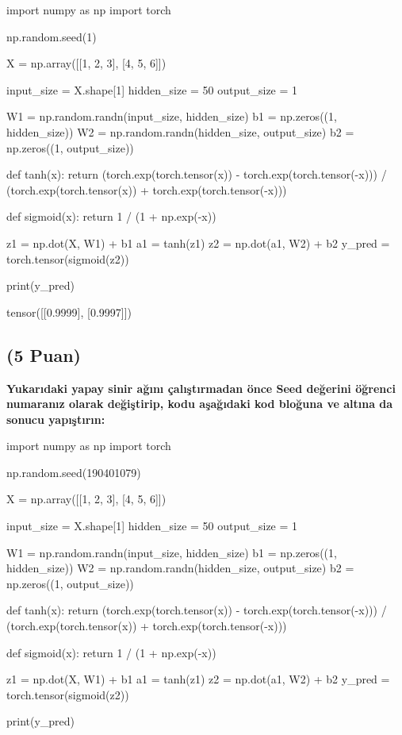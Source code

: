 \documentclass[11pt]{article}
\begin{document}
\begin{python}
import numpy as np
import torch


np.random.seed(1)

X = np.array([[1, 2, 3], [4, 5, 6]])


input_size = X.shape[1]  
hidden_size = 50          
output_size = 1           

W1 = np.random.randn(input_size, hidden_size)  
b1 = np.zeros((1, hidden_size))               
W2 = np.random.randn(hidden_size, output_size) 
b2 = np.zeros((1, output_size))               


def tanh(x):
    return (torch.exp(torch.tensor(x)) - torch.exp(torch.tensor(-x))) / (torch.exp(torch.tensor(x)) + torch.exp(torch.tensor(-x)))


def sigmoid(x):
    return 1 / (1 + np.exp(-x))


z1 = np.dot(X, W1) + b1   
a1 = tanh(z1)            
z2 = np.dot(a1, W2) + b2  
y_pred = torch.tensor(sigmoid(z2)) 

print(y_pred)
\end{python}

tensor([[0.9999],
        [0.9997]])

\subsection{(5 Puan)} \textbf{Yukarıdaki yapay sinir ağını çalıştırmadan önce Seed değerini öğrenci numaranız olarak değiştirip, kodu aşağıdaki kod bloğuna ve altına da sonucu yapıştırın:}

\begin{python}
import numpy as np
import torch


np.random.seed(190401079)

X = np.array([[1, 2, 3], [4, 5, 6]])


input_size = X.shape[1]  
hidden_size = 50          
output_size = 1           

W1 = np.random.randn(input_size, hidden_size)  
b1 = np.zeros((1, hidden_size))               
W2 = np.random.randn(hidden_size, output_size) 
b2 = np.zeros((1, output_size))               


def tanh(x):
    return (torch.exp(torch.tensor(x)) - torch.exp(torch.tensor(-x))) / (torch.exp(torch.tensor(x)) + torch.exp(torch.tensor(-x)))


def sigmoid(x):
    return 1 / (1 + np.exp(-x))


z1 = np.dot(X, W1) + b1   
a1 = tanh(z1)            
z2 = np.dot(a1, W2) + b2  
y_pred = torch.tensor(sigmoid(z2)) 

print(y_pred)
\end{python}
\end{document}

